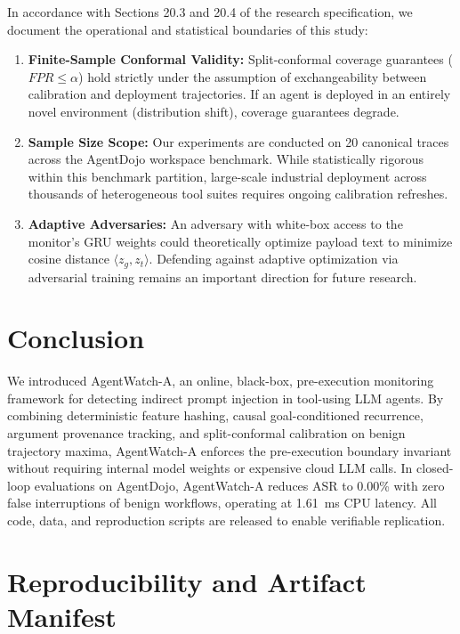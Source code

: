 \documentclass[11pt,a4paper]{article}
\begin{document}
In accordance with Sections 20.3 and 20.4 of the research specification, we document the operational and statistical boundaries of this study:
\begin{enumerate}
    \item \textbf{Finite-Sample Conformal Validity:} Split-conformal coverage guarantees ($FPR \le \alpha$) hold strictly under the assumption of exchangeability between calibration and deployment trajectories. If an agent is deployed in an entirely novel environment (distribution shift), coverage guarantees degrade.
    \item \textbf{Sample Size Scope:} Our experiments are conducted on 20 canonical traces across the AgentDojo workspace benchmark. While statistically rigorous within this benchmark partition, large-scale industrial deployment across thousands of heterogeneous tool suites requires ongoing calibration refreshes.
    \item \textbf{Adaptive Adversaries:} An adversary with white-box access to the monitor's GRU weights could theoretically optimize payload text to minimize cosine distance $\langle z_g, z_t \rangle$. Defending against adaptive optimization via adversarial training remains an important direction for future research.
\end{enumerate}

\section{Conclusion}
\label{sec:conclusion}

We introduced AgentWatch-A, an online, black-box, pre-execution monitoring framework for detecting indirect prompt injection in tool-using LLM agents. By combining deterministic feature hashing, causal goal-conditioned recurrence, argument provenance tracking, and split-conformal calibration on benign trajectory maxima, AgentWatch-A enforces the pre-execution boundary invariant without requiring internal model weights or expensive cloud LLM calls. In closed-loop evaluations on AgentDojo, AgentWatch-A reduces ASR to 0.00\% with zero false interruptions of benign workflows, operating at 1.61~ms CPU latency. All code, data, and reproduction scripts are released to enable verifiable replication.




\appendix
\section{Reproducibility and Artifact Manifest}
\label{sec:appendix}
\end{document}
